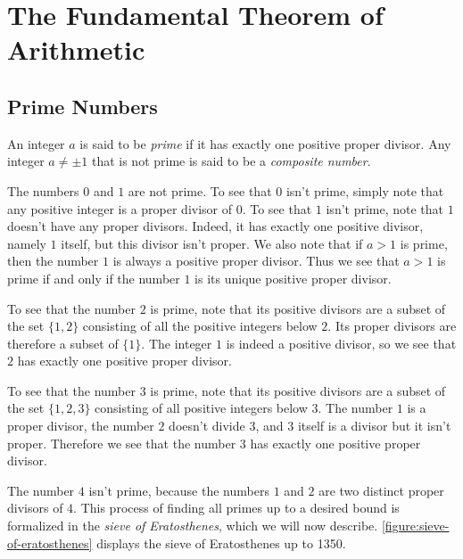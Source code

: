 \chapter{The Fundamental Theorem of Arithmetic}\label{chapter:fundamental-theorem-of-arithmetic}

\section{Prime Numbers}

\begin{definition}
  An integer $a$ is said to be \emph{prime} if it has exactly one positive proper divisor. Any integer $a\neq \pm 1$ that is not prime is said to be a \emph{composite number}.
\end{definition}

The numbers $0$ and $1$ are not prime. To see that $0$ isn't prime, simply note that any positive integer is a proper divisor of $0$. To see that $1$ isn't prime, note that $1$ doesn't have any proper divisors. Indeed, it has exactly one positive divisor, namely $1$ itself, but this divisor isn't proper. We also note that if $a>1$ is prime, then the number $1$ is always a positive proper divisor. Thus we see that $a>1$ is prime if and only if the number $1$ is its unique positive proper divisor.

To see that the number $2$ is prime, note that its positive divisors are a subset of the set $\{1,2\}$ consisting of all the positive integers below $2$. Its proper divisors are therefore a subset of $\{1\}$. The integer $1$ is indeed a positive divisor, so we see that $2$ has exactly one positive proper divisor.

To see that the number $3$ is prime, note that its positive divisors are a subset of the set $\{1,2,3\}$ consisting of all positive integers below $3$. The number $1$ is a proper divisor, the number $2$ doesn't divide $3$, and $3$ itself is a divisor but it isn't proper. Therefore we see that the number $3$ has exactly one positive proper divisor.

The number $4$ isn't prime, because the numbers $1$ and $2$ are two distinct proper divisors of $4$. This process of finding all primes up to a desired bound is formalized in the \emph{sieve of Eratosthenes}, which we will now describe. \cref{figure:sieve-of-eratosthenes} displays the sieve of Eratosthenes up to 1350.

